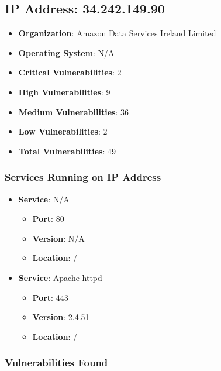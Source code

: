 \documentclass{article}
\begin{document}
\clearpage



\subsection{IP Address: 34.242.149.90}

\begin{itemize}
    \item \textbf{Organization}: Amazon Data Services Ireland Limited
    \item \textbf{Operating System}:  N/A 
    \item \textbf{Critical Vulnerabilities}: 2
    \item \textbf{High Vulnerabilities}: 9
    \item \textbf{Medium Vulnerabilities}: 36
    \item \textbf{Low Vulnerabilities}: 2
    \item \textbf{Total Vulnerabilities}: 49
\end{itemize}

\subsubsection*{Services Running on IP Address}

\begin{itemize}
    
        \item \textbf{Service}: N/A
        \begin{itemize}
            \item \textbf{Port}: 80
            \item \textbf{Version}:  N/A 
            \item \textbf{Location}: \href{ / }{ / }
        \end{itemize}
    
        \item \textbf{Service}: Apache httpd
        \begin{itemize}
            \item \textbf{Port}: 443
            \item \textbf{Version}:  2.4.51 
            \item \textbf{Location}: \href{ / }{ / }
        \end{itemize}
    
\end{itemize}


\subsubsection*{Vulnerabilities Found}
\end{document}

